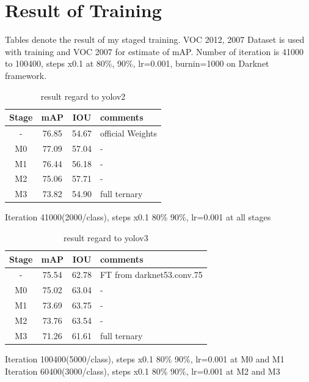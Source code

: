 \documentclass[twocolumn]{article}
\begin{document}
\section{Result of Training}

Tables denote the result of my staged training.
VOC 2012, 2007 Dataset is used with training and VOC 2007 for estimate of mAP.
Number of iteration is 41000 to 100400, steps x0.1 at 80\%, 90\%, lr=0.001, burnin=1000 on Darknet framework.

\begin{table}[htbp]
 \centering
 \begin{tabular}{c|c|c|l}
  Stage & mAP & IOU & comments \\ \hline\hline
  -        & 76.85 & 54.67 & official Weights \\ \hline
  M0       & 77.09 & 57.04 & -                \\ \hline
  M1       & 76.44 & 56.18 & -                \\ \hline
  M2       & 75.06 & 57.71 & -                \\ \hline
  M3       & 73.82 & 54.90 & full ternary     \\ \hline\hline
 \end{tabular}
 \caption{result regard to yolov2}
 \label{tb:yolov2}
\end{table}

Iteration 41000(2000/class), steps x0.1 80\% 90\%, lr=0.001 at all stages

\begin{table}[htbp]
 \centering
 \begin{tabular}{c|c|c|l}
  Stage & mAP & IOU & comments \\ \hline\hline
  -        & 75.54 & 62.78 & FT from darknet53.conv.75 \\ \hline
  M0       & 75.02 & 63.04 & -                \\ \hline
  M1       & 73.69 & 63.75 & -                \\ \hline
  M2       & 73.76 & 63.54 & -                \\ \hline
  M3       & 71.26 & 61.61 & full ternary     \\ \hline\hline
 \end{tabular}
 \caption{result regard to yolov3}
 \label{tb:yolov3}
\end{table}

Iteration 100400(5000/class), steps x0.1 80\% 90\%, lr=0.001 at M0 and M1
Iteration 60400(3000/class), steps x0.1 80\% 90\%, lr=0.001 at M2 and M3
\end{document}
